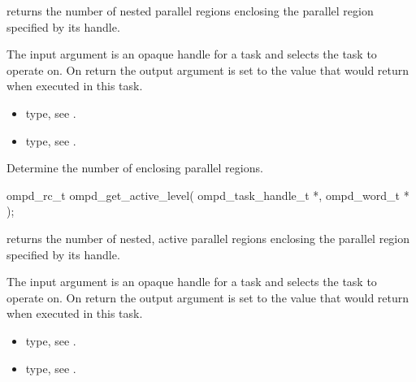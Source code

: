 \descr
{} returns the number of nested
parallel regions enclosing the parallel region specified by its handle.

\argdesc
The input argument  is an opaque handle for a task and selects the task to operate on.
On return the output argument  is set to the value that  would return 
when executed in this task.


\crossreferences
\begin{itemize}
	\item {} type, see .
	\item {} type, see .
\end{itemize}


\label{ompd:ompd_get_active_level}
\summary
Determine the number of enclosing  parallel regions.

\format
\cspecificstart
\begin{ompSyntax}
ompd_rc_t ompd_get_active_level(
  ompd_task_handle_t *,
  ompd_word_t *
);
\end{ompSyntax}
\cspecificend

\descr
{} returns the number of nested, active
parallel regions enclosing the parallel region specified by its handle.

\argdesc
The input argument  is an opaque handle for a task and selects the task to operate on.
On return the output argument  is set to the value that  would return when
executed in this task.

\crossreferences
\begin{itemize}
	\item {} type, see .
	\item {} type, see .
\end{itemize}

